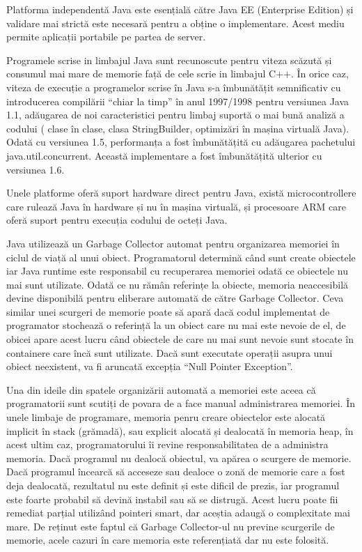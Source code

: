\documentclass[12pt]{book}
\begin{document}
Platforma independentă Java este esențială către Java EE (Enterprise Edition) și validare mai strictă este necesară pentru a obține o implementare. Acest mediu permite aplicații portabile pe partea de server.

Programele scrise in limbajul Java sunt recunoscute pentru viteza scăzută și consumul mai mare de memorie față de cele scrie in limbajul C++. În orice caz, viteza de execuție a programelor scrise în Java s-a îmbunătățit semnificativ cu introducerea compilării “chiar la timp” în anul 1997/1998 pentru versiunea Java 1.1, adăugarea de noi caracteristici pentru limbaj suportă o mai bună analiză a codului ( clase în clase, clasa StringBuilder, optimizări în mașina virtuală Java). Odată cu versiunea 1.5, performanța a fost îmbunătățită cu adăugarea pachetului java.util.concurrent. Această implementare a fost îmbunătățită ulterior cu versiunea 1.6.

Unele platforme oferă suport hardware direct pentru Java, există microcontrollere care rulează Java în hardware și nu în mașina virtuală, și procesoare ARM care oferă suport pentru execuția codului de octeți Java.

Java utilizează un Garbage Collector automat pentru organizarea memoriei în ciclul de viață al unui obiect. Programatorul determină când sunt create obiectele iar Java runtime este responsabil cu recuperarea memoriei odată ce obiectele nu mai sunt utilizate. Odată ce nu rămân referințe la obiecte, memoria neaccesibilă devine disponibilă pentru eliberare automată de către Garbage Collector. Ceva similar unei scurgeri de memorie poate să apară dacă codul implementat de programator stochează o referință la un obiect care nu mai este nevoie de el, de obicei apare acest lucru când obiectele de care nu mai sunt nevoie sunt stocate în containere care încă sunt utilizate. Dacă sunt executate operații asupra unui obiect neexistent, va fi aruncată excepția “Null Pointer Exception”. 

Una din ideile din spatele organizării automată a memoriei este aceea că programatorii sunt scutiți de povara de a face manual administrarea memoriei. În unele limbaje de programare, memoria penru creare obiectelor este alocată implicit în stack (grămadă), sau explicit alocată și dealocată în memoria heap, în acest ultim caz, programatorului îi revine responsabilitatea de a administra memoria. Dacă programul nu dealocă obiectul, va apărea o scurgere de memorie. Dacă programul încearcă să acceseze sau dealoce o zonă de memorie care a fost deja dealocată, rezultatul nu este definit și este dificil de prezis, iar programul este foarte probabil să devină instabil sau să se distrugă. Acest lucru poate fii remediat parțial utilizând pointeri smart, dar aceștia adaugă o complexitate mai mare. De reținut este faptul că Garbage Collector-ul nu previne scurgerile de memorie, acele cazuri în care memoria este referențiată dar nu este folosită.
\end{document}
